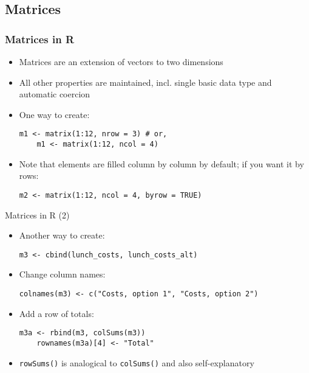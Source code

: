 \documentclass[10pt]{beamer}
\theoremstyle{definition}
\begin{document}
\subsection{Matrices}
\begin{frame}[fragile]
\frametitle{Matrices in R}
\begin{itemize}
	\item Matrices are an extension of vectors to two dimensions

	\item All other properties are maintained, incl. single basic data type and automatic coercion
	
	\item One way to create:
	\begin{lstlisting}[style = rstyle, breaklines]
	m1 <- matrix(1:12, nrow = 3) # or,
	m1 <- matrix(1:12, ncol = 4)
	\end{lstlisting}

	\item Note that elements are filled column by column by default; if you want it by rows:
	\begin{lstlisting}[style = rstyle, breaklines]
	m2 <- matrix(1:12, ncol = 4, byrow = TRUE)
	\end{lstlisting}
\end{itemize}
\end{frame}



\begin{frame}[fragile]{Matrices in R (2)}
\begin{itemize}
	\item Another way to create:
	\begin{lstlisting}[style = rstyle, breaklines]
	m3 <- cbind(lunch_costs, lunch_costs_alt)	
	\end{lstlisting}
	
	\item Change column names:
	\begin{lstlisting}[style = rstyle, breaklines]
	colnames(m3) <- c("Costs, option 1", "Costs, option 2")
	\end{lstlisting}

	\item Add a row of totals:
	\begin{lstlisting}[style = rstyle, breaklines]
	m3a <- rbind(m3, colSums(m3))
	rownames(m3a)[4] <- "Total"
	\end{lstlisting}

	\item  \texttt{rowSums()} is analogical to \texttt{colSums()} and also self-explanatory
\end{itemize}
\end{frame}
\end{document}
